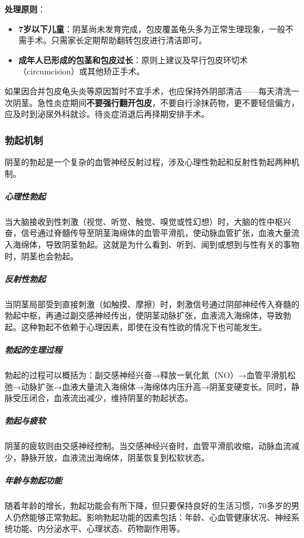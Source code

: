 \documentclass[12pt,a4paper,twoside]{ctexbook}
\begin{document}
\vspace{0.5em}
\noindent\textbf{处理原则}：
\begin{itemize}
	\item \textbf{7岁以下儿童}：阴茎尚未发育完成，包皮覆盖龟头多为正常生理现象，一般不需手术。只需家长定期帮助翻转包皮进行清洁即可。
	\item \textbf{成年人已形成的包茎和包皮过长}：原则上建议及早行包皮环切术（circumcision）或其他矫正手术。
\end{itemize}

\begin{tcolorbox}[colback=pink!5!white,colframe=red!50!black,title=贴心小叮咛]
如果因合并包皮龟头炎等原因暂时不宜手术，也应保持外阴部清洁——每天清洗一次阴茎。急性炎症期间\textbf{不要强行翻开包皮}，不要自行涂抹药物，更不要轻信偏方，应及时到泌尿外科就诊。待炎症消退后再择期安排手术。
\end{tcolorbox}
\subsubsection{勃起机制}

阴茎的勃起是一个复杂的血管神经反射过程，涉及心理性勃起和反射性勃起两种机制。

\subparagraph{心理性勃起}

当大脑接收到性刺激（视觉、听觉、触觉、嗅觉或性幻想）时，大脑的性中枢兴奋，信号通过脊髓传导至阴茎海绵体的血管平滑肌，使动脉血管扩张，血液大量流入海绵体，导致阴茎勃起。这就是为什么看到、听到、闻到或想到与性有关的事物时，阴茎也会勃起。

\subparagraph{反射性勃起}

当阴茎局部受到直接刺激（如触摸、摩擦）时，刺激信号通过阴部神经传入脊髓的勃起中枢，再通过副交感神经传出，使阴茎动脉扩张，血液流入海绵体，导致勃起。这种勃起不依赖于心理因素，即使在没有性欲的情况下也可能发生。

\subparagraph{勃起的生理过程}

勃起的过程可以概括为：副交感神经兴奋→释放一氧化氮（NO）→血管平滑肌松弛→动脉扩张→血液大量流入海绵体→海绵体内压升高→阴茎变硬变长。同时，静脉受压闭合，血液流出减少，维持阴茎的勃起状态。

\subparagraph{勃起与疲软}

阴茎的疲软则由交感神经控制。当交感神经兴奋时，血管平滑肌收缩，动脉血流减少，静脉开放，血液流出海绵体，阴茎恢复到松软状态。

\subparagraph{年龄与勃起功能}

随着年龄的增长，勃起功能会有所下降，但只要保持良好的生活习惯，70多岁的男人仍然能够正常勃起。影响勃起功能的因素包括：年龄、心血管健康状况、神经系统功能、内分泌水平、心理状态、药物副作用等。
\end{document}
